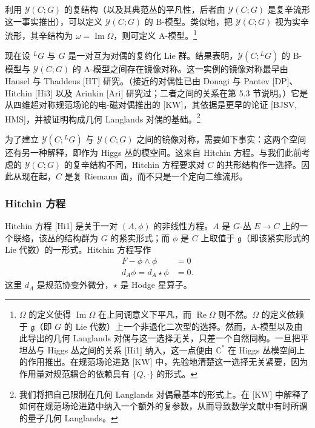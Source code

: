 \documentclass[11pt,a4paper]{article}
\begin{document}
利用 $\mathcal{Y}(C;G)$ 的复结构（以及其典范丛的平凡性，后者由 $\mathcal{Y}(C;G)$ 是复辛流形这一事实推出），可以定义 $\mathcal{Y}(C;G)$ 的 B-模型。类似地，把 $\mathcal{Y}(C;G)$ 视为实辛流形，其辛结构为 $\omega=\operatorname{Im}\Omega$，则可定义 A-模型。\footnote{$\Omega$ 的定义使得 $\operatorname{Im}\Omega$ 在上同调意义下平凡，而 $\operatorname{Re}\Omega$ 则不然。$\Omega$ 的定义依赖于 $\mathfrak{g}$（即 $G$ 的 Lie 代数）上一个非退化二次型的选择。然而，A-模型以及由此导出的几何 Langlands 对偶与这一选择无关，只差一个自然同构。一旦把平坦丛与 Higgs 丛之间的关系 [Hi1] 纳入，这一点便由 $\mathbb{C}^{*}$ 在 Higgs 丛模空间上的作用推出。在规范场论进路 [KW] 中，先验地清楚这一选择无关紧要，因为作用量对规范耦合的依赖具有 $\{Q,\cdot\}$ 的形式。}

现在设 ${}^{L}G$ 与 $G$ 是一对互为对偶的复约化 Lie 群。结果表明，$\mathcal{Y}(C;{}^{L}G)$ 的 B-模型与 $\mathcal{Y}(C;G)$ 的 A-模型之间存在镜像对称。这一实例的镜像对称最早由 Hausel 与 Thaddeus [HT] 研究。（接近的对偶性已由 Donagi 与 Pantev [DP]、Hitchin [Hi3] 以及 Arinkin [Ari] 研究过；二者之间的关系在第 5.3 节说明。）它是从四维超对称规范场论的电-磁对偶推出的 [KW]，其依据是更早的论证 [BJSV, HMS]，并被证明构成几何 Langlands 对偶的基础。\footnote{我们将把自己限制在几何 Langlands 对偶最基本的形式上。在 [KW] 中解释了如何在规范场论进路中纳入一个额外的复参数，从而导致数学文献中有时所谓的量子几何 Langlands。}


为了建立 $\mathcal{Y}(C;{}^{L}G)$ 与 $\mathcal{Y}(C;G)$ 之间的镜像对称，需要如下事实：这两个空间还有另一种解释，即作为 Higgs 丛的模空间。这来自 Hitchin 方程。与我们此前考虑的 $\mathcal{Y}(C;G)$ 的复辛结构不同，Hitchin 方程要求对 $C$ 的共形结构作一选择。因此从现在起，$C$ 是复 Riemann 面，而不只是一个定向二维流形。

\subsubsection{Hitchin 方程}

Hitchin 方程 [Hi1] 是关于一对 $(A,\phi)$ 的非线性方程。$A$ 是 $G$-丛 $E\to C$ 上的一个联络，该丛的结构群为 $G$ 的紧实形式；而 $\phi$ 是 $C$ 上取值于 $\mathfrak{g}$（即该紧实形式的 Lie 代数）的一形式。Hitchin 方程写作
\begin{equation}\tag{2.1}
\begin{aligned}
F - \phi\wedge\phi &= 0\\
d_A\phi = d_A\star\phi &= 0.
\end{aligned}
\end{equation}
这里 $d_A$ 是规范协变外微分，$\star$ 是 Hodge 星算子。
\end{document}
